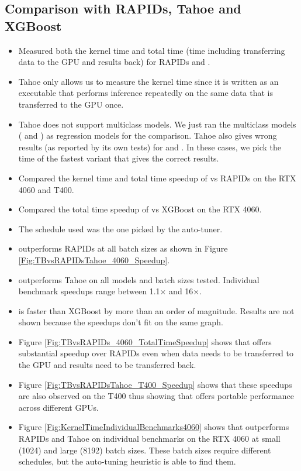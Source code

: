 \subsection{Comparison with RAPIDs, Tahoe and XGBoost}
\begin{itemize}
  \item Measured both the kernel time and total time (time including transferring data to the 
  GPU and results back) for RAPIDs and \Treebeard{}.
  \item Tahoe only allows us to measure the kernel time since it is written as an executable 
  that performs inference repeatedly on the same data that is transferred to the GPU once.
  \item Tahoe does not support multiclass models. We just ran the multiclass models ( and )
  as regression models for the comparison. Tahoe also gives wrong results (as reported by its own tests) for 
   and . In these cases, we pick the time of the fastest variant that gives the correct results.
  \item Compared the kernel time and total time speedup of \Treebeard{} vs RAPIDs on the RTX 4060 and T400.
  \item Compared the total time speedup of \Treebeard{} vs XGBoost on the RTX 4060.
  \item The schedule used was the one picked by the auto-tuner.
  \item \Treebeard{} outperforms RAPIDs at all batch sizes as shown in Figure \ref{Fig:TBvsRAPIDsTahoe_4060_Speedup}. 
  \item \Treebeard{} outperforms Tahoe on all models and batch sizes tested. Individual benchmark speedups range between 1.1$\times$ and 16$\times$.
  \item \Treebeard{} is faster than XGBoost by more than an order of magnitude. Results are not shown because the speedups don't fit on the same graph.
  \item Figure \ref{Fig:TBvsRAPIDs_4060_TotalTimeSpeedup} shows that \Treebeard{} offers substantial speedup over RAPIDs even when 
  data needs to be transferred to the GPU and results need to be transferred back.
  \item Figure \ref{Fig:TBvsRAPIDsTahoe_T400_Speedup} shows that these speedups are also observed on the T400 thus showing 
  that \Treebeard{} offers portable performance across different GPUs.
  \item Figure \ref{Fig:KernelTimeIndividualBenchmarks4060} shows that \Treebeard{} outperforms RAPIDs and Tahoe on 
  individual benchmarks on the RTX 4060 at small (1024) and large (8192) batch sizes. These batch sizes 
  require different schedules, but the \Treebeard{} auto-tuning heuristic is able to find them.
\end{itemize}

